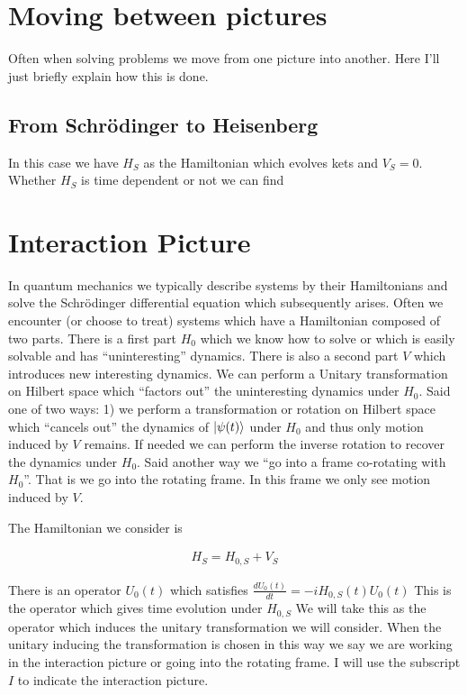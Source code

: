 \documentclass[12pt]{article}
\begin{document}
\section{Moving between pictures}

Often when solving problems we move from one picture into another. Here I'll just briefly explain how this is done.

\subsection{From Schr{\"o}dinger to Heisenberg}

In this case we have $H_S$ as the Hamiltonian which evolves kets and $V_S =0$. Whether $H_S$ is time dependent or not we can find 




\section{Interaction Picture}

In quantum mechanics we typically describe systems by their Hamiltonians and solve the Schr{\"o}dinger differential equation which subsequently arises.
Often we encounter (or choose to treat) systems which have a Hamiltonian composed of two parts. There is a first part $H_0$ which we know how to solve or which is easily solvable and has ``uninteresting'' dynamics. There is also a second part $V$ which introduces new interesting dynamics. We can perform a Unitary transformation on Hilbert space which ``factors out'' the uninteresting dynamics under $H_0$. Said one of two ways: 1) we perform a transformation or rotation on Hilbert space which ``cancels out'' the dynamics of $\ket{\psi(t)}$ under $H_0$ and thus only motion induced by $V$ remains. If needed we can perform the inverse rotation to recover the dynamics under $H_0$. Said another way we ``go into a frame co-rotating with $H_0$''. That is we go into the rotating frame. In this frame we only see motion induced by $V$.

The Hamiltonian we consider is

\begin{align}
H_S = H_{0,S} + V_S
\end{align}

There is an operator $U_0(t)$ which satisfies $\frac{d U_0(t)}{d t} = -i H_{0,S}(t) U_0(t)$ This is the operator which gives time evolution under $H_{0,S}$ We will take this as the operator which induces the unitary transformation we will consider. When the unitary inducing the transformation is chosen in this way we say we are working in the interaction picture or going into the rotating frame. I will use the subscript $I$ to indicate the interaction picture.
\end{document}

